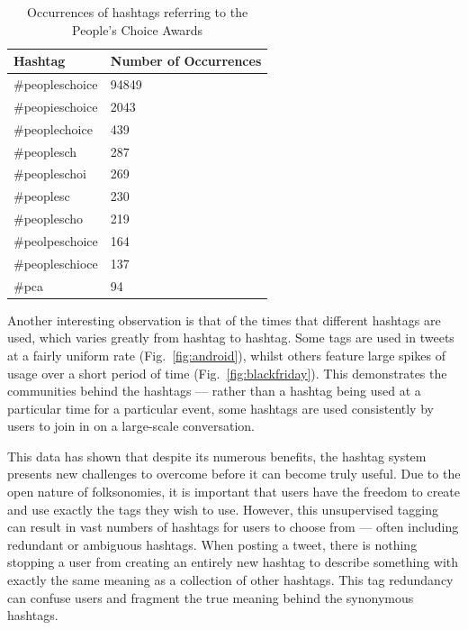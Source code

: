 \documentclass[11pt,a4paper]{report}
\begin{document}
\begin{table}[htpb]
\centering
\begin{tabular}{| l | l |}
    \hline
    \textbf{Hashtag} & \textbf{Number of Occurrences} \\
    \hline \hline
    \#peopleschoice & 94849 \\ \hline
    \#peopieschoice & 2043 \\ \hline
    \#peoplechoice  & 439 \\ \hline
    \#peoplesch     & 287 \\ \hline
    \#peopleschoi   & 269 \\ \hline
    \#peoplesc      & 230 \\ \hline
    \#peoplescho    & 219 \\ \hline
    \#peolpeschoice & 164 \\ \hline
    \#peopleschioce & 137 \\ \hline
    \#pca           & 94 \\ \hline
\end{tabular}
\caption{Occurrences of hashtags referring to the People's Choice Awards}
\label{tbl:redundancy}
\end{table}

Another interesting observation is that of the times that different hashtags are used, which varies greatly from hashtag to hashtag. Some tags are used in tweets at a fairly uniform rate (Fig.~\ref{fig:android}), whilst others feature large spikes of usage over a short period of time (Fig.~\ref{fig:blackfriday}). This demonstrates the communities behind the hashtags --- rather than a hashtag being used at a particular time for a particular event, some hashtags are used consistently by users to join in on a large-scale conversation.

This data has shown that despite its numerous benefits, the hashtag system presents new challenges to overcome before it can become truly useful. Due to the open nature of folksonomies, it is important that users have the freedom to create and use exactly the tags they wish to use. However, this unsupervised tagging can result in vast numbers of hashtags for users to choose from --- often including redundant or ambiguous hashtags. When posting a tweet, there is nothing stopping a user from creating an entirely new hashtag to describe something with exactly the same meaning as a collection of other hashtags. This tag redundancy can confuse users and fragment the true meaning behind the synonymous hashtags.
\end{document}

